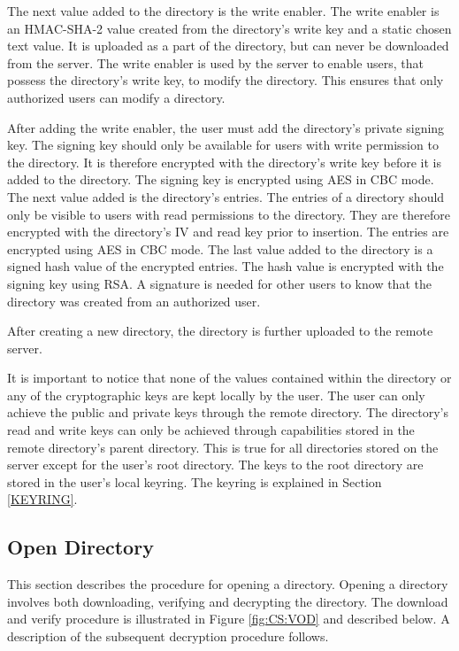 \documentclass[pdftex,english,10pt,b5paper,twoside]{book}
\begin{document}
The next value added to the directory is the write enabler. The write enabler is
an HMAC-SHA-2 value created from the directory's write key and a static chosen
text value. It is uploaded as a part of the directory, but can never be
downloaded from the server. The write enabler is used by the server to enable
users, that possess the directory's write key, to modify the directory. This
ensures that only authorized users can modify a directory.

After adding the write enabler, the user must add the directory's private
signing key. The signing key should only be available for users with write
permission to the directory. It is therefore encrypted with the directory's
write key before it is added to the directory. The signing key is encrypted using \ac{AES} in
\ac{CBC} mode. The next value added is the directory's entries. The entries of a
directory should only be visible to users with read permissions to
the directory. They are therefore encrypted with the directory's \ac{IV} and read
key prior to insertion. The entries are encrypted using \ac{AES} in \ac{CBC} mode. The
last value added to the directory is a signed hash value of the encrypted
entries. The hash value is encrypted with the signing key using \ac{RSA}. A
signature is needed for other users to know that the directory was created from
an authorized user.

After creating a new directory, the directory is further uploaded to the remote
server.

It is important to notice that none of the values contained within the
directory or any of the cryptographic keys are kept locally by the user. The
user can only achieve the public and private keys through the remote directory.
The directory's read and write keys can only be achieved through capabilities stored
in the remote directory's parent directory. This is true for all directories
stored on the server except for the user's root directory. The keys to the
root directory are stored in the user's local keyring. The keyring is explained
in Section \ref{KEYRING}.

\subsection{Open Directory}

This section describes the procedure for opening a directory. Opening a
directory involves both downloading, verifying and decrypting the directory. The
download and verify procedure is illustrated in Figure \ref{fig:CS:VOD} and
described below. A description of the subsequent decryption procedure follows.
\end{document}
